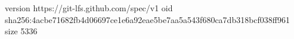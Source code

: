 version https://git-lfs.github.com/spec/v1
oid sha256:4acbe71682fb4d06697ce1e6a92eae5be7aa5a543f680ca7db318bcf038ff961
size 5336
